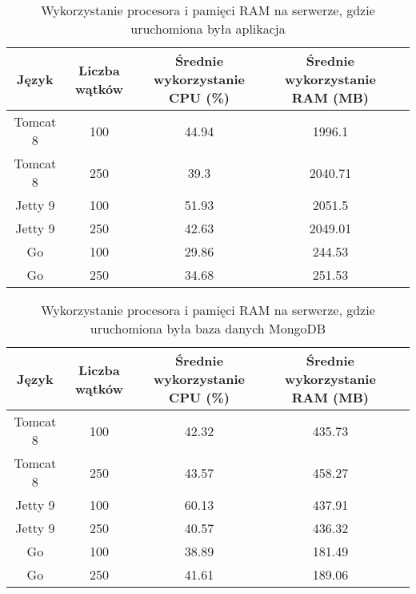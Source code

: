 
\begin{table}[!htb]
\centering
\caption{Wykorzystanie procesora i pamięci RAM na serwerze, gdzie uruchomiona była aplikacja}
\label{tab:app-full-key}
\begin{tabular}{@{}ccccl@{}}
\toprule
\textbf{Język} & \textbf{Liczba wątków} & \multicolumn{1}{p{3cm}}{\textbf{Średnie wykorzystanie CPU (\%)}} & \multicolumn{1}{p{3cm}}{\textbf{Średnie wykorzystanie RAM (MB)}} &  \\ \midrule
Tomcat 8       & 100                    & 44.94                             & 1996.1                          &  \\
Tomcat 8       & 250                    & 39.3                             & 2040.71                          &  \\
Jetty 9       & 100                    & 51.93                             & 2051.5                          &  \\
Jetty 9       & 250                    & 42.63                             & 2049.01                          &  \\
Go       & 100                    & 29.86                             & 244.53                          &  \\
Go       & 250                    & 34.68                             & 251.53                          &  \\
\bottomrule
\end{tabular}
\end{table}


\begin{table}[!htb]
\centering
\caption{Wykorzystanie procesora i pamięci RAM na serwerze, gdzie uruchomiona była baza danych MongoDB}
\label{tab:mongo-full-key}
\begin{tabular}{@{}ccccl@{}}
\toprule
\textbf{Język} & \textbf{Liczba wątków} & \multicolumn{1}{p{3cm}}{\textbf{Średnie wykorzystanie CPU (\%)}} & \multicolumn{1}{p{3cm}}{\textbf{Średnie wykorzystanie RAM (MB)}} &  \\ \midrule
Tomcat 8       & 100                    & 42.32                             & 435.73                          &  \\
Tomcat 8       & 250                    & 43.57                             & 458.27                          &  \\
Jetty 9       & 100                    & 60.13                             & 437.91                          &  \\
Jetty 9       & 250                    & 40.57                             & 436.32                          &  \\
Go       & 100                    & 38.89                             & 181.49                          &  \\
Go       & 250                    & 41.61                             & 189.06                          &  \\
\bottomrule
\end{tabular}
\end{table}

